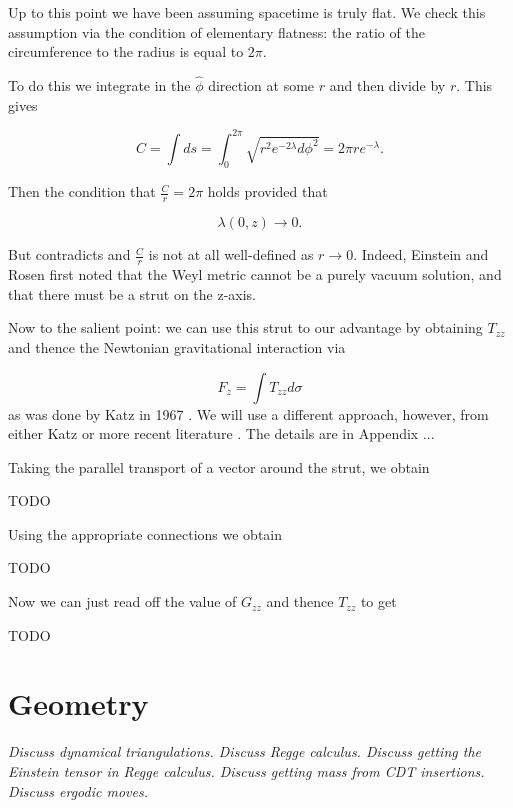 \documentclass[12pt]{article}
\begin{document}
Up to this point we have been assuming spacetime is truly flat. We check this assumption via the condition of elementary flatness: the ratio of the circumference to the radius is equal to $2\pi$. 

To do this we integrate in the $\hat{\phi}$ direction at
some $r$ and then divide by $r$. This gives

\begin{equation}
  \label{eq:phi-hat-length}
  C=\int ds =
  \int_0^{2\pi}\sqrt{r^2e^{-2\lambda}d\phi^2}={2\pi re^{-\lambda}}.
\end{equation}

Then the condition that $\frac{C}{r}=2\pi$ holds provided that

\begin{equation}
	\label{eq:lambda-elem-flat}
	\lambda(0,z)\rightarrow 0.
\end{equation} 

But  contradicts  and $\frac{C}{r}$ is not at all well-defined as $r\rightarrow 0$. Indeed, Einstein and Rosen \cite{einstein-rosen-1936} first noted that the Weyl metric cannot be a purely vacuum solution, and that there must be a strut on the z-axis.

Now to the salient point: we can use this strut to our advantage by obtaining $T_{zz}$ and thence the Newtonian gravitational interaction via

\begin{equation}
	\label{eq:F_z}
	F_{z}=\int T_{zz}d\sigma
\end{equation}
as was done by Katz in 1967 \cite{katz1967derivation}. We will use a different approach, however, from either Katz or more recent literature \cite{letelier_superposition_1997}. The details are in Appendix ...

Taking the parallel transport of a vector around the strut, we obtain

TODO

Using the appropriate connections we obtain

TODO

Now we can just read off the value of $G_{zz}$ and thence $T_{zz}$ to get

TODO

\section{Geometry}

\textit{Discuss dynamical triangulations. Discuss Regge calculus. Discuss getting the Einstein tensor in Regge calculus. Discuss getting mass from CDT insertions. Discuss ergodic moves.}
\end{document}
